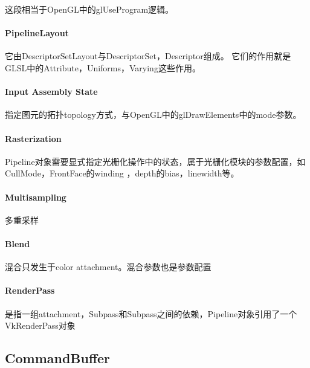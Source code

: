 这段相当于OpenGL中的glUseProgram逻辑。

\paragraph{PipelineLayout}
它由DescriptorSetLayout与DescriptorSet，Descriptor组成。
它们的作用就是GLSL中的Attribute，Uniforms，Varying这些作用。

\paragraph{Input Assembly State}
指定图元的拓扑topology方式，与OpenGL中的glDrawElements中的mode参数。

\paragraph{Rasterization}
Pipeline对象需要显式指定光栅化操作中的状态，属于光栅化模块的参数配置，如CullMode，FrontFace的winding
，depth的bias，linewidth等。

\paragraph{Multisampling}
多重采样

\paragraph{Blend}
混合只发生于color attachment。混合参数也是参数配置

\paragraph{RenderPass}
是指一组attachment，Subpass和Subpass之间的依赖，Pipeline对象引用了一个VkRenderPass对象

\subsection{CommandBuffer}


